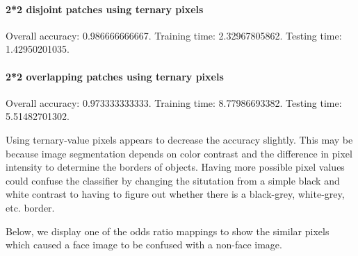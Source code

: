 \paragraph{2*2 disjoint patches using ternary pixels} Overall accuracy: 0.986666666667. Training time: 2.32967805862. Testing time: 1.42950201035.
\paragraph{2*2 overlapping patches using ternary pixels} Overall accuracy: 0.973333333333. Training time: 8.77986693382. Testing time:  5.51482701302.

Using ternary-value pixels appears to decrease the accuracy slightly. This may be because image segmentation depends on color contrast and the difference in pixel intensity to determine the borders of objects. Having more possible pixel values could confuse the classifier by changing the situtation from a simple black and white contrast to having to figure out whether there is a black-grey, white-grey, etc. border.

Below, we display one of the odds ratio mappings to show the similar pixels which caused a face image to be confused with a non-face image.

